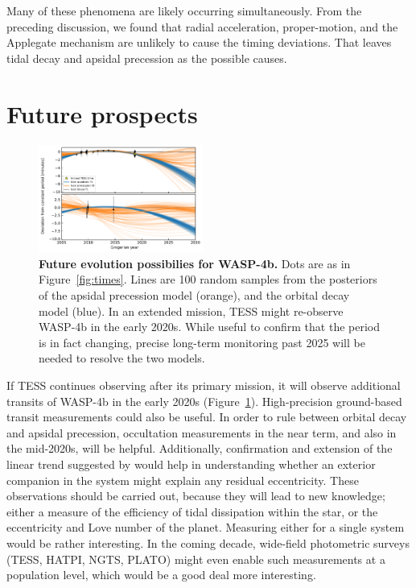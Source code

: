 \documentclass[12pt,twocolumn,tighten]{aastex62}
\begin{document}
Many of these phenomena are likely occurring simultaneously.  From the
preceding discussion, we found that radial acceleration,
proper-motion, and the Applegate mechanism are unlikely to cause the
timing deviations.  That leaves tidal decay and apsidal precession as
the possible causes.



\section{Future prospects}
\label{sec:future}

\begin{figure}[!t]
	\begin{center}
		\leavevmode
		\includegraphics[width=0.48\textwidth]{f5.pdf}
	\end{center}
  \vspace{-0.5cm}
	\caption{
		{\bf Future evolution possibilies for WASP-4b.}
		Dots are as in Figure~\ref{fig:times}.
		Lines are 100 random samples from the posteriors of the apsidal
		precession model (orange), and the orbital decay model (blue).
		In an extended mission, TESS might re-observe WASP-4b in the early
		2020s. While useful to confirm that the period is
		in fact changing, precise long-term monitoring past 2025 will
		be needed to resolve the two models.
		\label{fig:future}
	}
\end{figure}

If TESS continues observing after its primary mission, it will observe
additional transits of WASP-4b in the early 2020s
(Figure~\ref{fig:future}).  High-precision ground-based transit
measurements could also be useful.  In order to rule between orbital
decay and apsidal precession, occultation measurements in the near term,
and also in the mid-2020s, will be helpful.  Additionally, confirmation
and extension of the linear trend suggested by
\citet{knutson_friends_2014} would help in understanding whether an
exterior companion in the system might explain any residual
eccentricity.  These observations should be carried out, because they
will lead to new knowledge; either a measure of the efficiency of tidal
dissipation within the star, or the eccentricity and Love number of the
planet.  Measuring either for a single system would be rather
interesting.  In the coming decade, wide-field photometric surveys
(TESS, HATPI, NGTS, PLATO) might even enable such measurements at a
population level, which would be a good deal more interesting.
\end{document}
